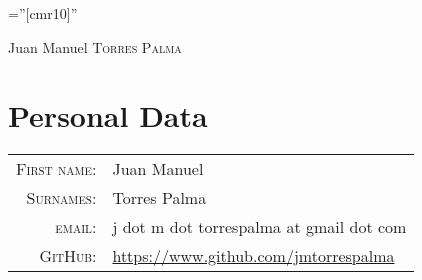 \documentclass[a4paper,10pt]{article}
\begin{document}

\pagestyle{empty} %

\font\fb=''[cmr10]'' %

\par{\centering
		{\Huge Juan Manuel \textsc{Torres Palma}
	}\bigskip\par}

\section{Personal Data}

\begin{tabular}{rl}

    \textsc{First name:} & Juan Manuel \\
    \textsc{Surnames:} & Torres Palma \\
    \textsc{email:}     & j dot m dot torrespalma at gmail dot com}\\
    \textsc{GitHub:}     & \url{https://www.github.com/jmtorrespalma}
\end{tabular}

\end{document}
